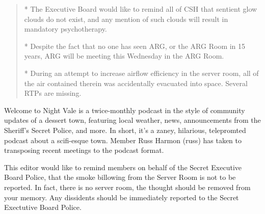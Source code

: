 \documentclass[9pt]{extarticle} %
\begin{document}
\begin{minipage}[t]{.66\linewidth}
\begin{quote}
 * The Executive Board would like to remind all of CSH that sentient
   glow clouds do not exist, and any mention of such clouds will result
   in mandatory psychotherapy.
   
 * Despite the fact that no one has seen ARG, or the ARG Room in 15 years,
   ARG will be meeting this Wednesday in the ARG Room.
   
 * During an attempt to increase airflow efficiency in the server room,
   all of the air contained therein was accidentally evacuated into
   space.  Several RTPs are missing.
\end{quote}

Welcome to Night Vale is a twice-monthly podcast in the style of community updates of a dessert town, featuring local weather, news, announcements from the Sheriff's Secret Police, and more. In short, it's a zaney, hilarious, telepromted podcast about a scifi-esque town. Member Russ Harmon (russ) has taken to transposing recent meetings to the podcast format. 

This editor would like to remind members on behalf of the Secret Executive Board Police, that the smoke billowing from the Server Room is not to be reported. In fact, there is no server room, the thought should be removed from your memory. Any dissidents should be immediately reported to the Secret Exectutive Board Police.

\end{minipage} %
\end{document}
